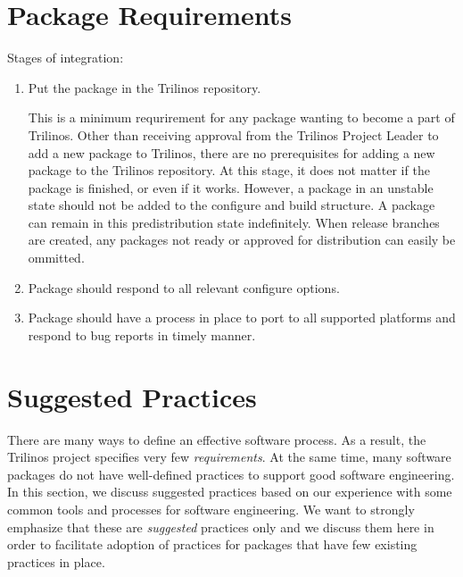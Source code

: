 \documentclass[12pt,relax]{SANDreport}
\begin{document}

\section{Package Requirements}

Stages of integration:
\begin{enumerate}
\item Put the package in the Trilinos repository.

This is a minimum requrirement for any package wanting to become a part of 
Trilinos.  Other than receiving approval from the Trilinos Project Leader to 
add a new package to Trilinos, there are no prerequisites for adding a new 
package to the Trilinos repository.  At this stage, it does not matter if the 
package is finished, or even if it works.  However, a package in an unstable 
state should not be added to the configure and build structure.  A package 
can remain in this predistribution state indefinitely.  When release branches 
are created, any packages not ready or approved for distribution can easily be 
ommitted.

\item Package should respond to all relevant configure options.
\item Package should have a process in place to port to all supported 
platforms and respond to bug reports in timely manner.
\end{enumerate}


\section{Suggested Practices}

There are many ways to define an effective software process.  As a result, the 
Trilinos project specifies very few {\it requirements}.  At the same time, 
many software packages do not have well-defined practices to support good 
software engineering.  In this section, we discuss suggested practices based 
on our experience with some common tools and processes for software 
engineering.  We want to strongly emphasize that these are {\it suggested} 
practices only and we discuss them here in order to facilitate adoption of 
practices for packages that have few existing practices in place.
\end{document}
